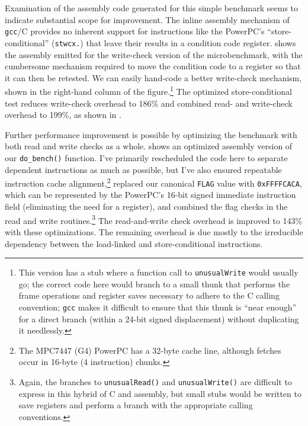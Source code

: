 Examination of the assembly code generated for this simple benchmark
seems to indicate substantial scope for improvement.  The inline
assembly mechanism of \texttt{gcc}/C provides no inherent support for
instructions 
like the PowerPC's ``store-conditional'' (\texttt{stwcx.}) that leave
their results in a condition code register.  
shows the assembly emitted for the write-check version of the
microbenchmark, with the cumbersome mechanism required to move the
condition code to a register so that it can then be retested.  We can
easily hand-code a better write-check mechanism, shown in the
right-hand column of the figure.\footnote{This version has a stub where a
function call to \texttt{unusualWrite} would usually go; the correct
code here would branch to a small thunk that performs the
frame operations and register saves necessary to adhere to the C
calling convention; \texttt{gcc} makes it difficult to ensure that
this thunk is ``near enough'' for a direct branch (within a 24-bit
signed displacement) without duplicating it needlessly.}
The optimized store-conditional test reduces write-check overhead to
186\% and combined read- and write-check overhead to 199\%, as shown
in .

Further performance improvement is possible by optimizing the
benchmark with both read and write checks as a whole. 
shows an
optimized assembly version of our \texttt{do\_bench()} function.  I've
primarily rescheduled the code here to separate dependent instructions
as much as possible, but I've also ensured repeatable instruction
cache alignment,\footnote{The MPC7447 (G4) PowerPC has a 32-byte cache
  line, although fetches occur in 16-byte (4 instruction) chunks.}
replaced our canonical \texttt{FLAG} value with
\texttt{0xFFFFCACA}, which can be represented by the PowerPC's 16-bit
signed immediate instruction field (eliminating the need for a
register), and combined the flag checks in
the read and write routines.\footnote{Again, the branches to
\texttt{unusualRead()} and 
\texttt{unusualWrite()} are difficult to express in this hybrid of C
and assembly, but small stubs would be written to save registers and
perform a branch with the appropriate calling conventions.}
The read-and-write check overhead is improved to 143\% with these
optimizations.  The remaining overhead is
due mostly to the irreducible dependency between the
load-linked and store-conditional instructions.

